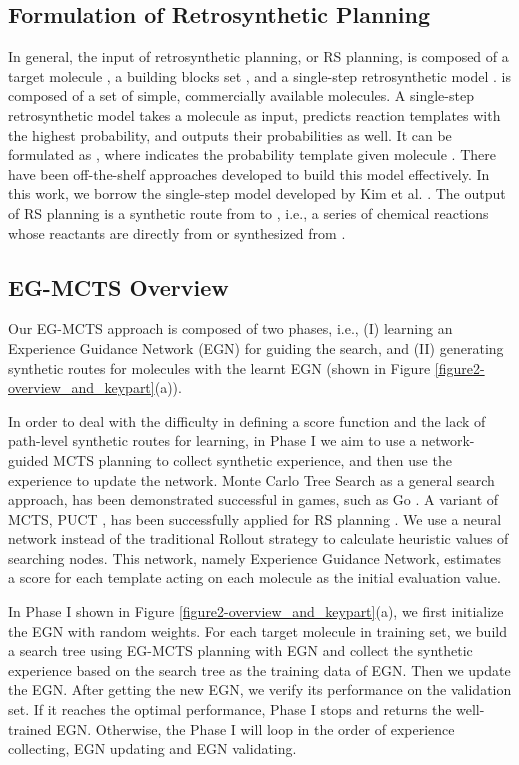 \documentclass[sn-mathphys,Numbered]{sn-jnl}
\begin{document}
\subsection{Formulation of Retrosynthetic Planning }
In general, the input of retrosynthetic planning, or RS planning, is composed of a target molecule , a building blocks set , and a single-step retrosynthetic model .  is composed of a set of simple, commercially available molecules. A single-step retrosynthetic model  takes a molecule  as input, predicts  reaction templates  with the highest probability, and outputs their probabilities  as well. It can be formulated as , where  indicates the probability  template  given molecule . There have been off-the-shelf approaches \cite{Coley2017, segler2017, segler2018, retro2020} developed to build this model effectively. In this work, we borrow the single-step model developed by Kim et al. \cite{2022}. The output of RS planning is a synthetic route from  to , i.e., a series of chemical reactions whose reactants are directly from  or synthesized from . 



\subsection{EG-MCTS Overview}
Our EG-MCTS approach is composed of two phases, i.e., (I) learning an Experience Guidance Network (EGN) for guiding the search, and (II) generating synthetic routes for molecules with the learnt EGN (shown in Figure \ref{figure2-overview_and_keypart}(a)).

In order to deal with the difficulty in defining a score function and the lack of path-level synthetic routes for learning, in Phase I we aim to use a network-guided MCTS planning to collect synthetic experience, and then use the experience to update the network. Monte Carlo Tree Search \citep{MCTS2006} as a general search approach, has been demonstrated successful in games, such as Go \citep{alphago, alphago2, alphago3}. 
A variant of MCTS, PUCT \citep{puct2010}, has been successfully applied for RS planning \citep{segler2018}. We use a neural network instead of the traditional Rollout strategy to calculate heuristic values of searching nodes. This network, namely Experience Guidance Network, estimates a score  for each template  acting on each molecule  as the initial evaluation value.

In Phase I shown in Figure \ref{figure2-overview_and_keypart}(a), we first initialize the EGN with random weights. For each target molecule in training set, we build a search tree using EG-MCTS planning with EGN and collect the synthetic experience based on the search tree as the training data of EGN. Then we update the EGN. After getting the new EGN, we verify its performance on the validation set. 
If it reaches the optimal performance, Phase I stops and returns the well-trained EGN. Otherwise, the Phase I will loop in the order of experience collecting, EGN updating and EGN validating.
\end{document}
